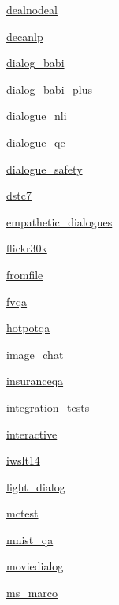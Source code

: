 \begin{DoxyCompactItemize}
 \hyperlink{namespaceparlai_1_1tasks_1_1dealnodeal}{dealnodeal}
\item 
 \hyperlink{namespaceparlai_1_1tasks_1_1decanlp}{decanlp}
\item 
 \hyperlink{namespaceparlai_1_1tasks_1_1dialog__babi}{dialog\+\_\+babi}
\item 
 \hyperlink{namespaceparlai_1_1tasks_1_1dialog__babi__plus}{dialog\+\_\+babi\+\_\+plus}
\item 
 \hyperlink{namespaceparlai_1_1tasks_1_1dialogue__nli}{dialogue\+\_\+nli}
\item 
 \hyperlink{namespaceparlai_1_1tasks_1_1dialogue__qe}{dialogue\+\_\+qe}
\item 
 \hyperlink{namespaceparlai_1_1tasks_1_1dialogue__safety}{dialogue\+\_\+safety}
\item 
 \hyperlink{namespaceparlai_1_1tasks_1_1dstc7}{dstc7}
\item 
 \hyperlink{namespaceparlai_1_1tasks_1_1empathetic__dialogues}{empathetic\+\_\+dialogues}
\item 
 \hyperlink{namespaceparlai_1_1tasks_1_1flickr30k}{flickr30k}
\item 
 \hyperlink{namespaceparlai_1_1tasks_1_1fromfile}{fromfile}
\item 
 \hyperlink{namespaceparlai_1_1tasks_1_1fvqa}{fvqa}
\item 
 \hyperlink{namespaceparlai_1_1tasks_1_1hotpotqa}{hotpotqa}
\item 
 \hyperlink{namespaceparlai_1_1tasks_1_1image__chat}{image\+\_\+chat}
\item 
 \hyperlink{namespaceparlai_1_1tasks_1_1insuranceqa}{insuranceqa}
\item 
 \hyperlink{namespaceparlai_1_1tasks_1_1integration__tests}{integration\+\_\+tests}
\item 
 \hyperlink{namespaceparlai_1_1tasks_1_1interactive}{interactive}
\item 
 \hyperlink{namespaceparlai_1_1tasks_1_1iwslt14}{iwslt14}
\item 
 \hyperlink{namespaceparlai_1_1tasks_1_1light__dialog}{light\+\_\+dialog}
\item 
 \hyperlink{namespaceparlai_1_1tasks_1_1mctest}{mctest}
\item 
 \hyperlink{namespaceparlai_1_1tasks_1_1mnist__qa}{mnist\+\_\+qa}
\item 
 \hyperlink{namespaceparlai_1_1tasks_1_1moviedialog}{moviedialog}
\item 
 \hyperlink{namespaceparlai_1_1tasks_1_1ms__marco}{ms\+\_\+marco}
\item 

\end{DoxyCompactItemize}
